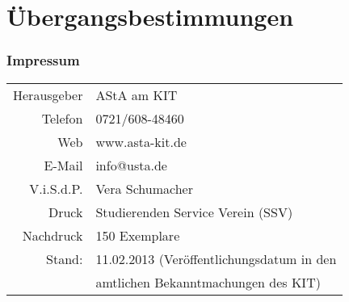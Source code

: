 \documentclass[
	a4paper,
	parskip=half,
	numbers=noenddot,
	titlepage,
	twoside,
	BCOR=2mm,
	DIV=12,
]{scrartcl}
\begin{document}
\part{Übergangsbestimmungen}

\begin{multicols}{2}

\end{multicols}


\vspace*{\fill}
\section*{Impressum}
\begin{tabular}{rl}
	Herausgeber & AStA am KIT \\
	Telefon & 0721/608-48460 \\
	Web & www.asta-kit.de \\
	E-Mail & info@usta.de\\
	V.i.S.d.P. & Vera Schumacher\\
	Druck & Studierenden Service Verein (SSV)\\
	Nachdruck & 150 Exemplare\\
	Stand: & 11.02.2013 (Veröffentlichungsdatum in den\\
& amtlichen Bekanntmachungen des KIT)
\end{tabular}
\end{document}
